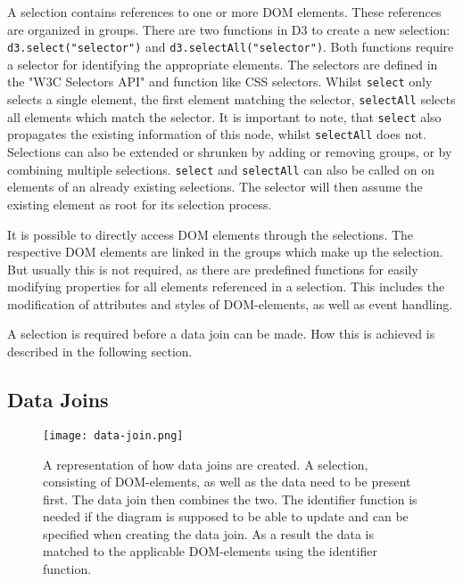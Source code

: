 A selection contains references to one or more DOM elements. These references are organized in groups. There are two functions in D3 to create a new selection: \verb|d3.select("selector")| and \verb|d3.selectAll("selector")|. Both functions require a selector for identifying the appropriate elements. The selectors are defined in the "W3C Selectors API" \cite{w3c_selectors_api} and function like CSS selectors. Whilst \verb|select| only selects a single element, the first element matching the selector, \verb|selectAll| selects all elements which match the selector. It is important to note, that \verb|select| also propagates the existing information of this node, whilst \verb|selectAll| does not. Selections can also be extended or shrunken by adding or removing groups, or by combining multiple selections. \verb|select| and \verb|selectAll| can also be called on on elements of an already existing selections. The selector will then assume the existing element as root for its selection process.

It is possible to directly access DOM elements through the selections. The respective DOM elements are linked in the groups which make up the selection. But usually this is not required, as there are predefined functions for easily modifying properties for all elements referenced in a selection. This includes the modification of attributes and styles of DOM-elements, as well as event handling.

A selection is required before a data join can be made. How this is achieved is described in the following section.


\subsection{Data Joins}

\begin{figure}[ht]
    \texttt{[image: data-join.png]}
    \captionsetup{width=0.9\textwidth}
    \caption[data-joins]{A representation of how data joins are created. A selection, consisting of DOM-elements, as well as the data need to be present first. The data join then combines the two. The identifier function is needed if the diagram is supposed to be able to update and can be specified when creating the data join. As a result the data is matched to the applicable DOM-elements using the identifier function.}
    \label{fig:data-joins}
\end{figure}

